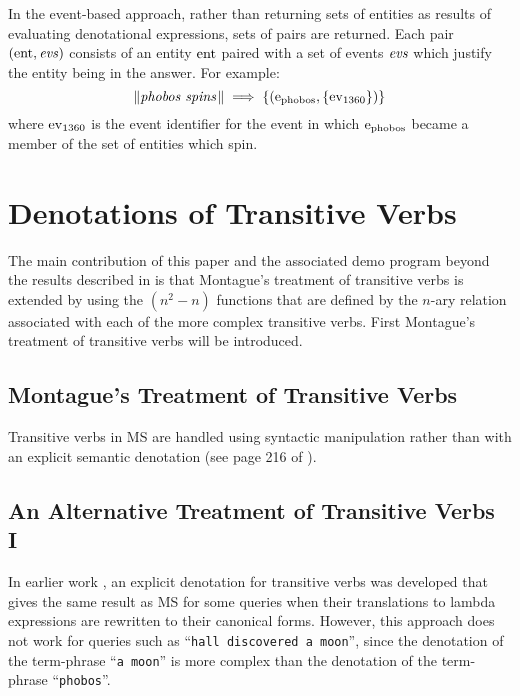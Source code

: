 \documentclass[../main.tex]{subfiles}
\begin{document}
\begin{refsection}
In the event-based approach, rather than returning sets of entities as results of evaluating denotational
expressions, sets of pairs are returned. Each pair $(\operatorname{ent}, \operatorname{\mathit{evs}})$ consists of an entity $\operatorname{ent}$ paired with a set of
events $\operatorname{\mathit{evs}}$ which justify the entity being in the answer. For example:
\[ \lVert\textit{phobos spins\hspace{0.1em}}\rVert \implies \{(\mathrm{e}_{\operatorname{\operatorname{phobos}}}, \{\operatorname{ev}_{1360}\})\} \]
where $\operatorname{ev}_{1360}$ is the event identifier for the event in which $\mathrm{e}_{\operatorname{\operatorname{phobos}}}$ became a member of the set of entities which spin.


\section{Denotations of Transitive Verbs}
\label{icsc2020conf:newuevflms}

The main contribution of this paper and the associated demo program beyond the results described in \cite{frost2014demonstration,hafiz:frost} is that Montague's treatment of transitive verbs is extended by using the
$(n^2 - n)$ functions that are defined by the $n$-ary relation associated with each of the more complex
transitive verbs. First Montague's treatment of transitive verbs will be introduced.

\subsection{Montague's Treatment of Transitive Verbs}


\label{icsc2020conf:montytransitive}
Transitive verbs in MS are handled using syntactic manipulation rather than with an explicit semantic denotation (see page 216 of \cite{Dowty:wall}).


\subsection{An Alternative Treatment of Transitive Verbs I}
In earlier work \cite {frost2006realization}, an explicit denotation for transitive verbs was developed that gives the same result as MS for some queries when their translations to lambda expressions are rewritten to their canonical forms. However, this approach does not work for queries such as ``\texttt{hall discovered a moon}'', since the denotation of the term-phrase ``\texttt{a moon}'' is more complex than the denotation of the term-phrase ``\texttt{phobos}''.


\end{refsection}
\end{document}
